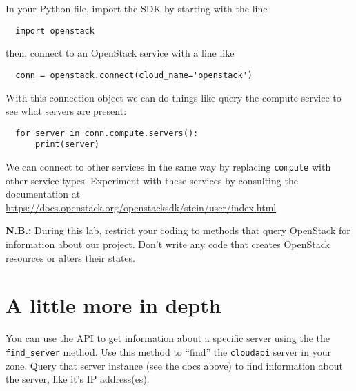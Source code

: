\documentclass{article}
\begin{document}
In your Python file, import the SDK by starting with the line

\begin{verbatim}
  import openstack
\end{verbatim}

then, connect to an OpenStack service with a line like

\begin{verbatim}
  conn = openstack.connect(cloud_name='openstack')
\end{verbatim}

With this connection object we can do things like query the compute service to see what servers are present:

\begin{verbatim}
  for server in conn.compute.servers():
      print(server)
\end{verbatim}

We can connect to other services in the same way by replacing \texttt{compute} with other service types. Experiment with these services by consulting the documentation at \url{https://docs.openstack.org/openstacksdk/stein/user/index.html}

\textbf{N.B.:} During this lab, restrict your coding to methods that query OpenStack for information about our project. Don't write any code that creates OpenStack resources or alters their states.

\section{A little more in depth}
You can use the API to get information about a specific server using the the \texttt{find\_server} method. Use this method to ``find'' the \texttt{cloudapi} server in your zone. Query that server instance (see the docs above) to find information about the server, like it's IP address(es).
\end{document}
